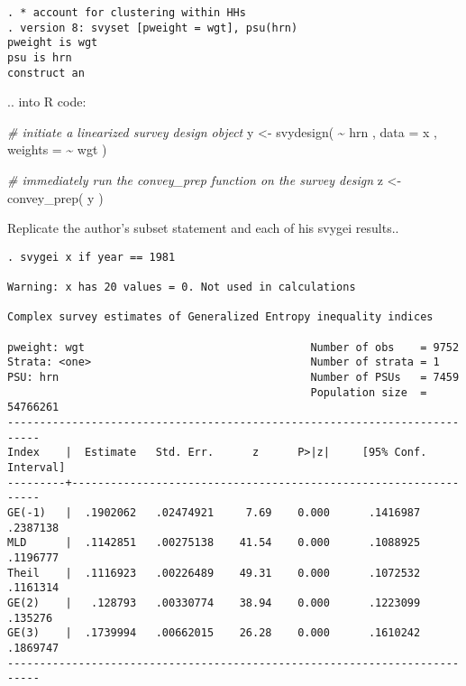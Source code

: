 \documentclass[
]{book}
\newenvironment{Shaded}{\begin{snugshade}}{\end{snugshade}}
\newcommand{\AttributeTok}[1]{\textcolor[rgb]{0.77,0.63,0.00}{#1}}
\newcommand{\CommentTok}[1]{\textcolor[rgb]{0.56,0.35,0.01}{\textit{#1}}}
\newcommand{\FunctionTok}[1]{\textcolor[rgb]{0.00,0.00,0.00}{#1}}
\newcommand{\NormalTok}[1]{#1}
\newcommand{\OtherTok}[1]{\textcolor[rgb]{0.56,0.35,0.01}{#1}}
\newcommand{\SpecialCharTok}[1]{\textcolor[rgb]{0.00,0.00,0.00}{#1}}
\begin{document}
\begin{verbatim}
. * account for clustering within HHs 
. version 8: svyset [pweight = wgt], psu(hrn)
pweight is wgt
psu is hrn
construct an
\end{verbatim}

.. into R code:

\begin{Shaded}
\begin{Highlighting}[]
\CommentTok{\# initiate a linearized survey design object}
\NormalTok{y }\OtherTok{\textless{}{-}} \FunctionTok{svydesign}\NormalTok{( }\SpecialCharTok{\textasciitilde{}}\NormalTok{ hrn , }\AttributeTok{data =}\NormalTok{ x , }\AttributeTok{weights =} \SpecialCharTok{\textasciitilde{}}\NormalTok{ wgt )}

\CommentTok{\# immediately run the \textasciigrave{}convey\_prep\textasciigrave{} function on the survey design}
\NormalTok{z }\OtherTok{\textless{}{-}} \FunctionTok{convey\_prep}\NormalTok{( y )}
\end{Highlighting}
\end{Shaded}

Replicate the author's subset statement and each of his svygei results..

\begin{verbatim}
. svygei x if year == 1981
 
Warning: x has 20 values = 0. Not used in calculations

Complex survey estimates of Generalized Entropy inequality indices
 
pweight: wgt                                   Number of obs    = 9752
Strata: <one>                                  Number of strata = 1
PSU: hrn                                       Number of PSUs   = 7459
                                               Population size  = 54766261
---------------------------------------------------------------------------
Index    |  Estimate   Std. Err.      z      P>|z|     [95% Conf. Interval]
---------+-----------------------------------------------------------------
GE(-1)   |  .1902062   .02474921     7.69    0.000      .1416987   .2387138
MLD      |  .1142851   .00275138    41.54    0.000      .1088925   .1196777
Theil    |  .1116923   .00226489    49.31    0.000      .1072532   .1161314
GE(2)    |   .128793   .00330774    38.94    0.000      .1223099    .135276
GE(3)    |  .1739994   .00662015    26.28    0.000      .1610242   .1869747
---------------------------------------------------------------------------
\end{verbatim}
\end{document}
